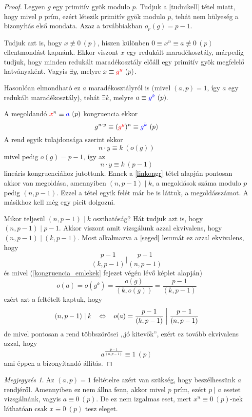 \documentclass[12pt]{book}
\theoremstyle{plain} %
\theoremstyle{definition} %
\theoremstyle{remark}
\newtheorem*{mj}{Megjegyzés}
\numberwithin{equation}{section}  %
\begin{document}
	\begin{proof}
		Legyen $g$ egy primitív gyök modulo $p$. Tudjuk a \ref{tudnikell} tétel miatt, hogy mivel $p$ prím, ezért létezik primitív gyök modulo $p$, tehát nem hülyeség a bizonyítás első mondata. Azaz a továbbiakban $o_p(g)=p-1$.
		
		Tudjuk azt is, hogy $x\not\equiv 0\ (p)$, hiszen különben $0\equiv x^n \equiv a \not\equiv 0\ (p)$ ellentmondást kapnánk. Ekkor viszont $x$ egy redukált maradékosztály, márpedig tudjuk, hogy minden redukált maradékosztály előáll egy primitív gyök megfelelő hatványaként. Vagyis $\exists y$, melyre $x\equiv \color{red}g^y\color{black}\ (p)$.
		
		Hasonlóan elmondható ez $a$ maradékosztályról is (mivel $(a,p)=1$, így $a$ egy redukált maradékosztály), tehát $\exists k$, melyre $a\equiv \color{blue}g^k\color{black}\ (p)$.
		
		A megoldandó $\color{red}x\color{black}^n \equiv \color{blue}a\color{black}\ (p)$ kongruencia ekkor
		\[ g^{n\cdot y} \equiv (\color{red}g^y\color{black})^n \equiv \color{blue}g^k\color{black}\ (p)  \]
		A rend egyik tulajdonsága szerint ekkor
		\[ n\cdot y \equiv k\ (o(g))  \]
		mivel pedig $o(g)=p-1$, így az
		\[ n\cdot y \equiv k\ (p-1)  \]
		lineáris kongruenciához jutottunk. Ennek a \ref{linkongr} tétel alapján pontosan akkor van megoldása, amennyiben $(n,p-1)\mid k$, a megoldások száma modulo $p$ pedig $(n,p-1)$. Ezzel a tétel egyik felét már be is láttuk, a megoldásszámot. A másikhoz kell még egy picit dolgozni.
		
		Mikor teljesül $(n,p-1)\mid k$ oszthatóság? Hát tudjuk azt is, hogy $(n,p-1)\mid p-1$. Akkor viszont amit vizsgálunk azzal ekvivalens, hogy $(n,p-1)\mid (k,p-1)$. Most alkalmazva a \ref{seged} lemmát ez azzal ekvivalens, hogy
		\[ \dfrac{p-1}{(k,p-1)} \mathrel{\bigg|}  \dfrac{p-1}{(n,p-1)} \]
		és mivel (\ref{kongruencia_emlekek} fejezet végén lévő képlet alapján)
		\[ o(a) = o(g^k) = \dfrac{o(g)}{(k,o(g))} = \dfrac{p-1}{(k,p-1)} \]
		ezért azt a feltételt kaptuk, hogy
		\[ (n,p-1)\mid k \hspace{3mm} \Leftrightarrow \hspace{3mm} o(a)=\dfrac{p-1}{(k,p-1)} \mathrel{\bigg|} \dfrac{p-1}{(n,p-1)}  \]
		de mivel pontosan a rend többszörösei ,,jó kitevők'', ezért ez tovább ekvivalens azzal, hogy
		\[ a^{\frac{p-1}{(n,p-1)}} \equiv 1\ (p)  \]
		ami éppen a bizonyítandó állítás.
	\end{proof}
	
	\begin{mj}
		Az $(a,p)=1$ feltételre azért van szükség, hogy beszélhessünk $a$ rendjéről. Amennyiben ez nem állna fenn, akkor mivel $p$ prím, ezért $p\mid a$ esetet vizsgálnánk, vagyis $a\equiv 0\ (p)$. De ez nem izgalmas eset, mert $x^n \equiv 0\ (p)$-nek láthatóan csak $x\equiv 0\ (p)$ tesz eleget.
	\end{mj}
\end{document}
